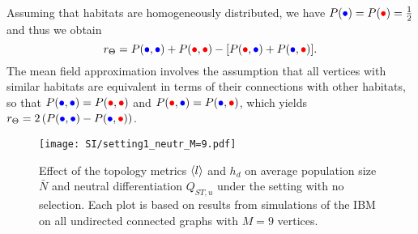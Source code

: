 Assuming that habitats are homogeneously distributed, we have $P(\bcirc) = P(\rcirc) = \frac{1}{2}$ and thus we obtain
\begin{equation}\label{eqSI:r_theta_homo}
  r_\Theta =   P(\bcirc,\bcirc) + P(\rcirc,\rcirc)   -  [ P(\rcirc,\bcirc) + P(\bcirc,\rcirc)].
\end{equation}
%
The mean field approximation involves the assumption that all vertices with similar habitats are equivalent in terms of their connections with other habitats, so that $P(\bcirc,\bcirc) = P(\rcirc,\rcirc)$ and $P(\rcirc,\bcirc) = P(\bcirc,\rcirc)$, which yields $r_\Theta = 2 \left( P({\bcirc},{\bcirc}) - P({\bcirc},{\rcirc}) \right)$.


\printbibliography[heading=subbibliography]

\clearpage



\begin{figure}[t]
  \centerline{
      \texttt{[image: SI/setting1\_neutr\_M=9.pdf]} 
  }
  \caption{Effect of the topology metrics $\langle l \rangle$ and $h_d$ on average population size $\bar{N}$ and neutral differentiation $Q_{ST,u}$ under the setting with no selection. Each plot is based on results from  simulations of the IBM on all undirected connected graphs with $M=9$ vertices.}
  \label{figSI:setting1_neutr_M=9}
\end{figure}
\FloatBarrier


